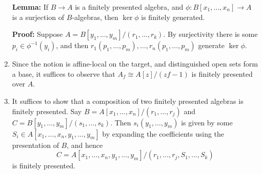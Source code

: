 \documentclass{report}
\begin{document}
\begin{enumerate}[label=\textbf{7.3.\Alph*.}]
	      \textbf{Lemma:} If $B\to A$ is a finitely presented algebra, and
	      $\phi:B[x_1,\ldots,x_n]\to A$ is a surjection of $B$-algebras, then
	      $\ker\phi$ is finitely generated.

	      \textbf{Proof:} Suppose $A=B[y_1,\ldots,y_m]/(r_1,\ldots,r_k)$. By
	      surjectivity there is some $p_i\in\phi^{-1}(y_i)$, and then
	      $r_1(p_1,\ldots,p_m),\ldots,r_n(p_1,\ldots,p_m)$ generate $\ker\phi$.

	\item Since the notion is affine-local on the target, and distinguished
	      open sets form a base, it suffices to observe that
	      $A_f\cong A[z]/(zf-1)$ is finitely presented over $A$.

	\item It suffices to show that a composition of two finitely presented
	      algebras is finitely presented. Say
	      $B=A[x_1,\ldots,x_n]/(r_1,\ldots,r_j)$ and
	      $C=B[y_1,\ldots,y_m]/(s_1,\ldots,s_k)$. Then $s_i(y_1,\ldots,y_m)$ is
	      given by some $S_i\in A[x_1,\ldots,x_n,y_1,\ldots,y_m]$ by expanding
	      the coefficients using the presentation of $B$, and hence
	      \begin{equation*}
		      C=A[x_1,\ldots,x_n,y_1,\ldots,y_m]/(r_1,\ldots,r_j,S_1,\ldots,S_k)
	      \end{equation*}
	      is finitely presented.
\end{enumerate}
\end{document}
